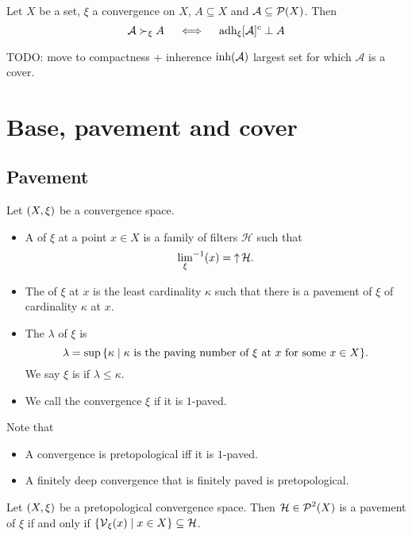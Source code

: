 \begin{proposition}
Let $X$ be a set, $\xi$ a convergence on $X$, $A\subseteq X$ and $\mathcal{A}\subseteq \operatorname{\mathcal{P}}(X)$. Then
\[ \mathcal{A} \succ_\xi A \quad\iff\quad \operatorname{adh}_\xi [\mathcal{A}]^c \perp A \]
\end{proposition}


TODO: move to compactness + inherence $\operatorname{inh}(\mathcal{A})$ largest set for which $\mathcal{A}$ is a cover.


\section{Base, pavement and cover}
\subsection{Pavement}
\begin{definition}
Let $\left( X,\xi \right)$ be a convergence space.
\begin{itemize}
\item A  of $\xi$ at a point $x\in X$ is a family of filters $\mathcal{H}$ such that
\[ {\lim_\xi}^{-1}(x) = \operatorname{\uparrow}\mathcal{H}. \]
\item The  of $\xi$ at $x$ is the least cardinality $\kappa$ such that there is a pavement of $\xi$ of cardinality $\kappa$ at $x$.
\item The  $\lambda$ of $\xi$ is
\[ \lambda = \sup\setbuilder{\kappa}{\text{$\kappa$ is the paving number of $\xi$ at $x$ for some $x\in X$}}. \]
We say $\xi$ is  if $\lambda \leq \kappa$.
\item We call the convergence $\xi$  if it is $1$-paved.
\end{itemize}
\end{definition}
Note that
\begin{itemize}
\item A convergence is pretopological iff it is $1$-paved.
\item A finitely deep convergence that is finitely paved is pretopological.
\end{itemize}

\begin{lemma}
Let $\left( X,\xi \right)$ be a pretopological convergence space. Then $\mathcal{H}\in\operatorname{\mathcal{P}}^2(X)$ is a pavement of $\xi$ \textup{if and only if} $\setbuilder{\vicinity_\xi(x)}{x\in X} \subseteq \mathcal{H}$.
\end{lemma}

